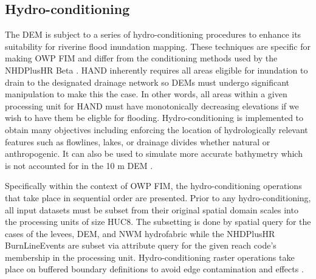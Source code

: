 \documentclass[draft]{dependencies/agujournal2019}
\begin{document}
\subsection{Hydro-conditioning}
\label{ssec:hydro_conditioning}
%
The DEM is subject to a series of hydro-conditioning procedures to enhance its suitability for riverine flood inundation mapping. 
These techniques are specific for making OWP FIM and differ from the conditioning methods used by the NHDPlusHR Beta \cite{moore2019user}.
HAND inherently requires all areas eligible for inundation to drain to the designated drainage network so DEMs must undergo significant manipulation to make this the case.
In other words, all areas within a given processing unit for HAND must have monotonically decreasing elevations if we wish to have them be eligble for flooding.
Hydro-conditioning is implemented to obtain many objectives including enforcing the location of hydrologically relevant features such as flowlines, lakes, or drainage divides whether natural or anthropogenic. 
It can also be used to simulate more accurate bathymetry which is not accounted for in the 10 m DEM \cite{gesch2002national}.

Specifically within the context of OWP FIM, the hydro-conditioning operations that take place in sequential order are presented. 
Prior to any hydro-conditioning, all input datasets must be subset from their original spatial domain scales into the processing units of size HUC8. 
The subsetting is done by spatial query for the cases of the levees, DEM, and NWM hydrofabric while the NHDPlusHR BurnLineEvents are subset via attribute query for the given reach code's membership in the processing unit.
Hydro-conditioning raster operations take place on buffered boundary definitions to avoid edge contamination and effects \cite{lindsay2013measuring}. 
%
\end{document}
